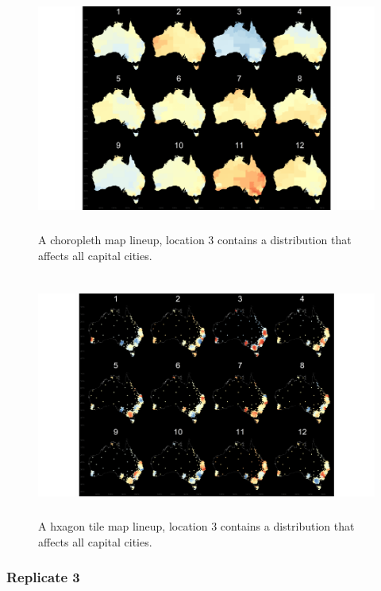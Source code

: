 \documentclass{monashthesis}
\begin{document}
\begin{figure}[H]
\centering
\includegraphics[height=8cm]{lineups/cities-geo3-1.pdf}
\caption{\label{fig:cities-geo3}A choropleth map lineup, location 3 contains a distribution that affects all capital cities.}
\end{figure}

\begin{figure}[H]
\centering
\includegraphics[height=8cm]{lineups/cities-hex3-1.pdf}
\caption{\label{fig:cities-hex3}A hxagon tile map lineup, location 3 contains a distribution that affects all capital cities.}
\end{figure}

\hypertarget{replicate-3}{%
\subsubsection{Replicate 3}\label{replicate-3}}
\end{document}
